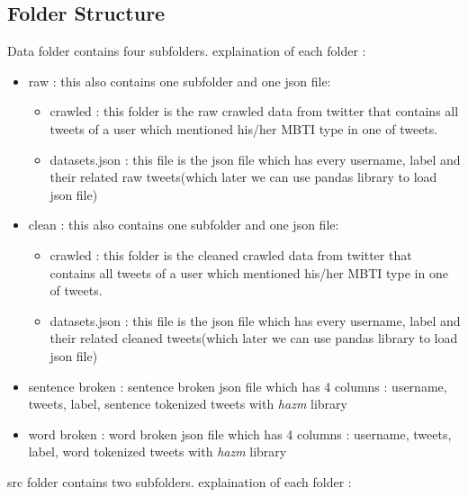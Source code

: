 \documentclass[10pt, a4paper]{article}
\begin{document}
\subsection{Folder Structure}
Data folder contains four subfolders. explaination of each folder :
\begin{itemize}
    \item raw : this also contains one subfolder and one json file:
          \begin{itemize}
              \item crawled : this folder is the raw crawled data from twitter that contains all tweets of a user which mentioned
                    his/her MBTI type in one of tweets.
              \item datasets.json : this file is the json file which has every username, label and their related raw tweets(which later we can use pandas library to load json file)
          \end{itemize}
    \item clean : this also contains one subfolder and one json file:
          \begin{itemize}
              \item crawled : this folder is the cleaned crawled data from twitter that contains all tweets of a user which mentioned
                    his/her MBTI type in one of tweets.
              \item datasets.json : this file is the json file which has every username, label and their related cleaned tweets(which later we can use pandas library to load json file)
          \end{itemize}
    \item sentence broken : sentence broken json file which has 4 columns : username, tweets, label, sentence tokenized tweets with \textit{hazm} library
    \item word broken : word broken json file which has 4 columns : username, tweets, label, word tokenized tweets with \textit{hazm} library
\end{itemize}
src folder contains two subfolders. explaination of each folder :
\end{document}
